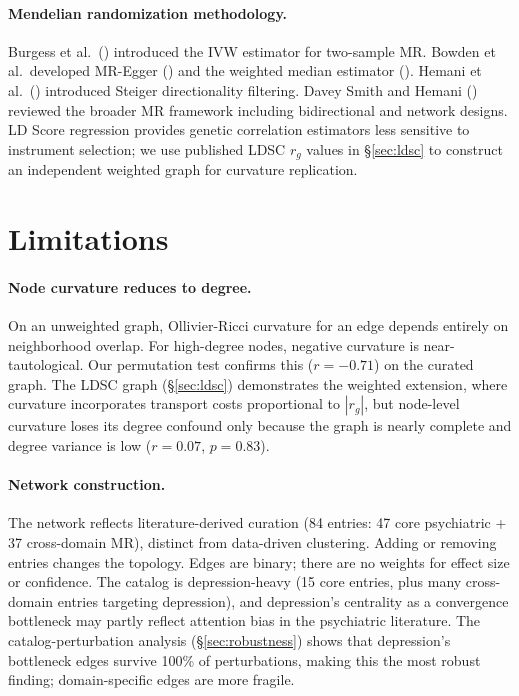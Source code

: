 \documentclass{article}
\begin{document}
\paragraph{Mendelian randomization methodology.} Burgess et al.\ (\citeyear{burgess2013mendelian}) introduced the IVW estimator for two-sample MR. Bowden et al.\ developed MR-Egger (\citeyear{bowden2015mendelian}) and the weighted median estimator (\citeyear{bowden2016consistent}). Hemani et al.\ (\citeyear{hemani2017orienting}) introduced Steiger directionality filtering. Davey Smith and Hemani (\citeyear{daveysmith2014mendelian}) reviewed the broader MR framework including bidirectional and network designs. LD Score regression \citep{buliksullivan2015ld, buliksullivan2015atlas} provides genetic correlation estimators less sensitive to instrument selection; we use published LDSC $r_g$ values in \S\ref{sec:ldsc} to construct an independent weighted graph for curvature replication.

\section{Limitations}
\label{sec:limitations}

\paragraph{Node curvature reduces to degree.} On an unweighted graph, Ollivier-Ricci curvature for an edge depends entirely on neighborhood overlap. For high-degree nodes, negative curvature is near-tautological. Our permutation test confirms this ($r = -0.71$) on the curated graph. The LDSC graph (\S\ref{sec:ldsc}) demonstrates the weighted extension, where curvature incorporates transport costs proportional to $|r_g|$, but node-level curvature loses its degree confound only because the graph is nearly complete and degree variance is low ($r = 0.07$, $p = 0.83$).

\paragraph{Network construction.} The network reflects literature-derived curation (84 entries: 47 core psychiatric + 37 cross-domain MR), distinct from data-driven clustering. Adding or removing entries changes the topology. Edges are binary; there are no weights for effect size or confidence. The catalog is depression-heavy (15 core entries, plus many cross-domain entries targeting depression), and depression's centrality as a convergence bottleneck may partly reflect attention bias in the psychiatric literature. The catalog-perturbation analysis (\S\ref{sec:robustness}) shows that depression's bottleneck edges survive 100\% of perturbations, making this the most robust finding; domain-specific edges are more fragile.
\end{document}
